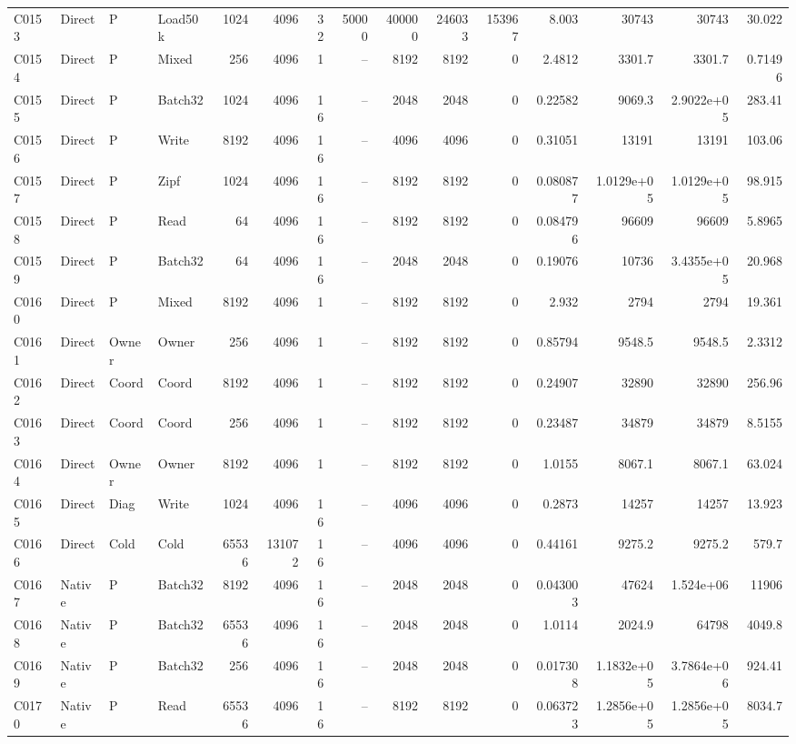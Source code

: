 \begin{landscape}
\begin{longtable}{llllrrrrrrrrrrr}
C0153 & Direct & P & Load50k & 1024 & 4096 & 32 & 50000 & 400000 & 246033 & 153967 & 8.003 & 30743 & 30743 & 30.022\\
C0154 & Direct & P & Mixed & 256 & 4096 & 1 & -- & 8192 & 8192 & 0 & 2.4812 & 3301.7 & 3301.7 & 0.71496\\
C0155 & Direct & P & Batch32 & 1024 & 4096 & 16 & -- & 2048 & 2048 & 0 & 0.22582 & 9069.3 & 2.9022e+05 & 283.41\\
C0156 & Direct & P & Write & 8192 & 4096 & 16 & -- & 4096 & 4096 & 0 & 0.31051 & 13191 & 13191 & 103.06\\
C0157 & Direct & P & Zipf & 1024 & 4096 & 16 & -- & 8192 & 8192 & 0 & 0.080877 & 1.0129e+05 & 1.0129e+05 & 98.915\\
C0158 & Direct & P & Read & 64 & 4096 & 16 & -- & 8192 & 8192 & 0 & 0.084796 & 96609 & 96609 & 5.8965\\
C0159 & Direct & P & Batch32 & 64 & 4096 & 16 & -- & 2048 & 2048 & 0 & 0.19076 & 10736 & 3.4355e+05 & 20.968\\
C0160 & Direct & P & Mixed & 8192 & 4096 & 1 & -- & 8192 & 8192 & 0 & 2.932 & 2794 & 2794 & 19.361\\
C0161 & Direct & Owner & Owner & 256 & 4096 & 1 & -- & 8192 & 8192 & 0 & 0.85794 & 9548.5 & 9548.5 & 2.3312\\
C0162 & Direct & Coord & Coord & 8192 & 4096 & 1 & -- & 8192 & 8192 & 0 & 0.24907 & 32890 & 32890 & 256.96\\
C0163 & Direct & Coord & Coord & 256 & 4096 & 1 & -- & 8192 & 8192 & 0 & 0.23487 & 34879 & 34879 & 8.5155\\
C0164 & Direct & Owner & Owner & 8192 & 4096 & 1 & -- & 8192 & 8192 & 0 & 1.0155 & 8067.1 & 8067.1 & 63.024\\
C0165 & Direct & Diag & Write & 1024 & 4096 & 16 & -- & 4096 & 4096 & 0 & 0.2873 & 14257 & 14257 & 13.923\\
C0166 & Direct & Cold & Cold & 65536 & 131072 & 16 & -- & 4096 & 4096 & 0 & 0.44161 & 9275.2 & 9275.2 & 579.7\\
C0167 & Native & P & Batch32 & 8192 & 4096 & 16 & -- & 2048 & 2048 & 0 & 0.043003 & 47624 & 1.524e+06 & 11906\\
C0168 & Native & P & Batch32 & 65536 & 4096 & 16 & -- & 2048 & 2048 & 0 & 1.0114 & 2024.9 & 64798 & 4049.8\\
C0169 & Native & P & Batch32 & 256 & 4096 & 16 & -- & 2048 & 2048 & 0 & 0.017308 & 1.1832e+05 & 3.7864e+06 & 924.41\\
C0170 & Native & P & Read & 65536 & 4096 & 16 & -- & 8192 & 8192 & 0 & 0.063723 & 1.2856e+05 & 1.2856e+05 & 8034.7\\

\end{longtable}
\end{landscape}
